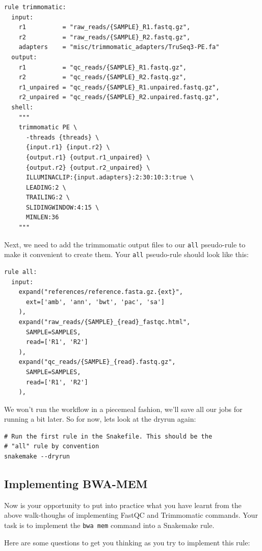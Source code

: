 \begin{lstlisting}
rule trimmomatic:
  input:
    r1          = "raw_reads/{SAMPLE}_R1.fastq.gz",
    r2          = "raw_reads/{SAMPLE}_R2.fastq.gz",
    adapters    = "misc/trimmomatic_adapters/TruSeq3-PE.fa"
  output:
    r1          = "qc_reads/{SAMPLE}_R1.fastq.gz",
    r2          = "qc_reads/{SAMPLE}_R2.fastq.gz",
    r1_unpaired = "qc_reads/{SAMPLE}_R1.unpaired.fastq.gz",
    r2_unpaired = "qc_reads/{SAMPLE}_R2.unpaired.fastq.gz",
  shell:
    """
    trimmomatic PE \
      -threads {threads} \
      {input.r1} {input.r2} \
      {output.r1} {output.r1_unpaired} \
      {output.r2} {output.r2_unpaired} \
      ILLUMINACLIP:{input.adapters}:2:30:10:3:true \
      LEADING:2 \
      TRAILING:2 \
      SLIDINGWINDOW:4:15 \
      MINLEN:36
    """
\end{lstlisting}

Next, we need to add the trimmomatic output files to our \texttt{all} pseudo-rule to make it convenient to create them.
Your \texttt{all} pseudo-rule should look like this:

\begin{lstlisting}
rule all:
  input:
    expand("references/reference.fasta.gz.{ext}",
      ext=['amb', 'ann', 'bwt', 'pac', 'sa']
    ),
    expand("raw_reads/{SAMPLE}_{read}_fastqc.html",
      SAMPLE=SAMPLES,
      read=['R1', 'R2']
    ),
    expand("qc_reads/{SAMPLE}_{read}.fastq.gz",
      SAMPLE=SAMPLES,
      read=['R1', 'R2']
    ),
\end{lstlisting}

We won't run the workflow in a piecemeal fashion, we'll save all our jobs for running a bit later.
So for now, lets look at the dryrun again:

\begin{lstlisting}
# Run the first rule in the Snakefile. This should be the
# "all" rule by convention
snakemake --dryrun
\end{lstlisting}

\subsection{Implementing BWA-MEM}

Now is your opportunity to put into practice what you have learnt from the above walk-thoughs of implementing FastQC and Trimmomatic commands.
Your task is to implement the \texttt{bwa mem} command into a Snakemake rule.

Here are some questions to get you thinking as you try to implement this rule:


